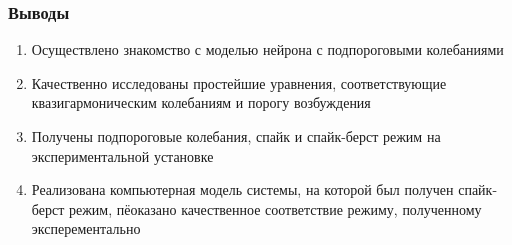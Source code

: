 \begin{frame}
	\frametitle{Выводы}
	\begin{enumerate}
		\item Осуществлено знакомство с моделью нейрона с подпороговыми колебаниями
		\item Качественно исследованы простейшие уравнения, соответствующие квазигармоническим колебаниям и порогу возбуждения
		\item Получены подпороговые колебания, спайк и спайк-берст режим на экспериментальной установке
		\item Реализована компьютерная модель системы, на которой был получен спайк-берст режим, пёоказано качественное соответствие режиму, полученному эксперементально
	\end{enumerate}
\end{frame}
